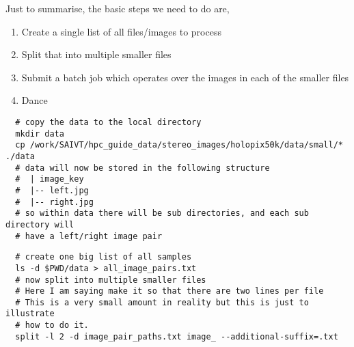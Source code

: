 %
%
Just to summarise, the basic steps we need to do are,
\begin{enumerate}
  \item Create a single list of all files/images to process
  \item Split that into multiple smaller files
  \item Submit a batch job which operates over the images in each of the smaller files
  \item Dance \smiley
\end{enumerate}
% 
% 
%
%
\begin{verbatim}
  # copy the data to the local directory
  mkdir data
  cp /work/SAIVT/hpc_guide_data/stereo_images/holopix50k/data/small/* ./data
  # data will now be stored in the following structure
  #  | image_key
  #  |-- left.jpg
  #  |-- right.jpg
  # so within data there will be sub directories, and each sub directory will
  # have a left/right image pair
\end{verbatim}

%
%
%
\begin{verbatim}
  # create one big list of all samples
  ls -d $PWD/data > all_image_pairs.txt
  # now split into multiple smaller files
  # Here I am saying make it so that there are two lines per file
  # This is a very small amount in reality but this is just to illustrate
  # how to do it. 
  split -l 2 -d image_pair_paths.txt image_ --additional-suffix=.txt
\end{verbatim}
%
%
%

